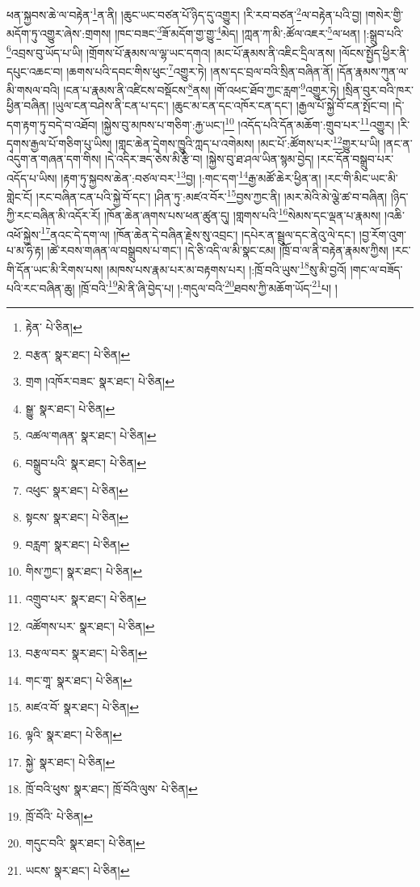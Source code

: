 ཕན་སྐྱབས་ཆེ་ལ་བརྟེན་\footnote{རྟེན་  པེ་ཅིན། }ན་ནི། །ཆུང་ཡང་བཙན་པོ་ཉིད་དུ་འགྱུར། །རི་རབ་བཙན་\footnote{བརྩན་  སྣར་ཐང་།  པེ་ཅིན། }ལ་བརྟེན་པའི་བྱ། །གསེར་གྱི་མདོག་ཏུ་འགྱུར་ཞེས་:གྲགས། །ཁང་བཟང་\footnote{གྲག །འཁོར་བཟང་  སྣར་ཐང་།  པེ་ཅིན། }ཟོ་མདོག་གྱ་གྱུ་\footnote{སྒྱུ་  སྣར་ཐང་།  པེ་ཅིན། }མེད། །ཀླན་ཀ་མི་:ཚོལ་འཇར་\footnote{འཚལ་གཞན་  སྣར་ཐང་།  པེ་ཅིན། }ལ་ཕན། །:སྒྲུབ་པའི་\footnote{བསྒྲུབ་པའི་  སྣར་ཐང་།  པེ་ཅིན། }འབྲས་བུ་ཡོད་པ་ཡི། །གྲོགས་པོ་རྣམས་ལ་ལྷ་ཡང་དགའ། །མང་པོ་རྣམས་ནི་འཇིང་དྲིལ་ནས། །ལོངས་སྤྱོད་ཕྱིར་ནི་དཔུང་འཆང་བ། །ཆགས་པའི་དབང་གིས་ཕུང་\footnote{འཕུང་  སྣར་ཐང་།  པེ་ཅིན། }འགྱུར་ཏེ། །ནས་དང་བྲལ་བའི་སྲིན་བཞིན་ནོ། །དོན་རྣམས་ཀུན་ལ་མི་གསལ་བའི། །ངན་པ་རྣམས་ནི་འཛིངས་བསྡོངས་\footnote{སྟངས་  སྣར་ཐང་།  པེ་ཅིན། }ནས། །གོ་འཕང་ཐོབ་ཀྱང་རླག་\footnote{བརླག་  སྣར་ཐང་།  པེ་ཅིན། }འགྱུར་ཏེ། །སྲིན་བུར་བའི་ཁར་ཕྱིན་བཞིན། །ཡུལ་ངན་བཤེས་ནི་ངན་པ་དང་། །ཆུང་མ་ངན་དང་འཁོར་ངན་དང་། །རྒྱལ་པོ་སྐྱེ་བོ་ངན་སྤོང་བ། །དེ་དག་རྟག་ཏུ་བདེ་བ་འཐོབ། །སྐྱེས་བུ་མཁས་པ་གཅིག་:རྐྱ་ཡང་།\footnote{གིས་ཀྱང་།  སྣར་ཐང་།  པེ་ཅིན། } །འདོད་པའི་དོན་མཆོག་:གྲུབ་པར་\footnote{འགྲུབ་པར་  སྣར་ཐང་།  པེ་ཅིན། }འགྱུར། །རི་དྭགས་རྒྱལ་པོ་གཅིག་པུ་ཡིས། །གླང་ཆེན་དྲེགས་ཁྱུའི་ཀླད་པ་འགེམས། །མང་པོ་:ཚོགས་པར་\footnote{འཚོགས་པར་  སྣར་ཐང་།  པེ་ཅིན། }གྱུར་པ་ཡི། །ནང་ན་འདུག་ན་གཞན་དག་གིས། །དེ་འདིར་ཟད་ཅེས་མི་རྩི་བ། །སྐྱེས་བུ་ཐ་ཤལ་ཡིན་སྙམ་བྱེད། །རང་དོན་བསྒྲུབ་པར་འདོད་པ་ཡིས། །རྟག་ཏུ་སྐྱབས་ཆེན་:བཙལ་བར་\footnote{བརྩལ་བར་  སྣར་ཐང་།  པེ་ཅིན། }བྱ། །:གང་དག་\footnote{གང་གཱ་  སྣར་ཐང་།  པེ་ཅིན། }རྒྱ་མཚོ་ཆེར་ཕྱིན་ན། །རང་གི་མིང་ཡང་མི་གླེང་ངོ། །རང་བཞིན་ངན་པའི་སྐྱེ་བོ་དང་། །ཤིན་ཏུ་:མཛའ་བོར་\footnote{མཛའ་བོ་  སྣར་ཐང་།  པེ་ཅིན། }བྱས་ཀྱང་ནི། །མར་མེའི་མེ་ལྕེ་ཚ་བ་བཞིན། །ཉིད་ཀྱི་རང་བཞིན་མི་འདོར་རོ། །ཁོན་ཆེན་ཞགས་པས་ཕན་ཚུན་དུ། །གླགས་པའི་\footnote{ལྟའི་  སྣར་ཐང་།  པེ་ཅིན། }སེམས་དང་ལྡན་པ་རྣམས། །འཆི་འཕོ་སྐྱེས་\footnote{སྐྱེ་  སྣར་ཐང་།  པེ་ཅིན། }ནའང་དེ་དག་ལ། །ཁོན་ཆེན་དེ་བཞིན་རྗེས་སུ་འབྲང་། །དཔེར་ན་སྦྲུལ་དང་ནེའུ་ལེ་དང་། །བྱ་རོག་འུག་པ་མ་ཧེ་རྟ། །ཚེ་རབས་གཞན་ལ་བསྒྲུབས་པ་གང་། །དེ་ཅི་འདི་ལ་མི་སྣང་ངམ། །ཁྲོ་བ་ལ་ནི་བརྟེན་རྣམས་ཀྱིས། །རང་གི་དོན་ཡང་མི་རིགས་པས། །མཁས་པས་རྣམ་པར་མ་བརྟགས་པར། །:ཁྲོ་བའི་ཡུས་\footnote{ཁྲོ་བའི་ཕུས་  སྣར་ཐང་། ཁྲོ་བོའི་ལུས་  པེ་ཅིན། }སུ་མི་བྱའོ། །གང་ལ་བཟོད་པའི་རང་བཞིན་ཆུ། །ཁྲོ་བའི་\footnote{ཁྲོ་བོའི་  པེ་ཅིན། }མེ་ནི་ཞི་བྱེད་པ། །:གདུལ་བའི་\footnote{གདུང་བའི་  སྣར་ཐང་།  པེ་ཅིན། }ཐབས་ཀྱི་མཆོག་ཡོད་\footnote{ཡངས་  སྣར་ཐང་།  པེ་ཅིན། }པ། །
